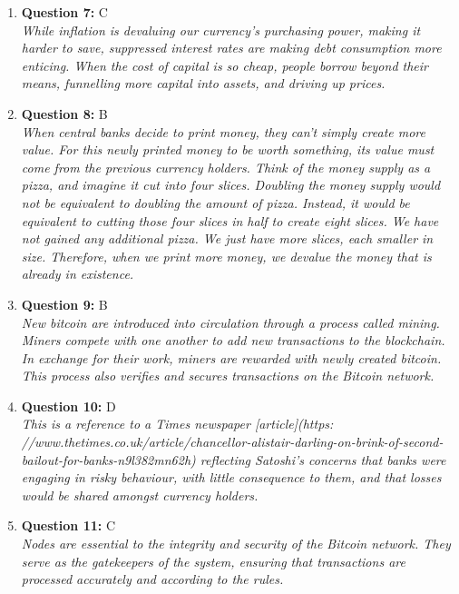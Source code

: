 \documentclass[12pt,a4paper]{article}
\begin{document}
\begin{enumerate}
\item \textbf{Question 7:} C
\\ \textit{While inflation is devaluing our currency’s purchasing power, making it 
harder to save, suppressed interest rates are making debt consumption 
more enticing. When the cost of capital is so cheap, people borrow beyond 
their means, funnelling more capital into assets, and driving up prices.}

\item \textbf{Question 8:} B
\\ \textit{When central banks decide to print money, they can’t simply create more value. 
For this newly printed money to be worth something, its value must come from the 
previous currency holders.
Think of the money supply as a pizza, and imagine it cut into four slices. 
Doubling the money supply would not be equivalent to doubling the amount of pizza. 
Instead, it would be equivalent to cutting those four slices in half to create 
eight slices. We have not gained any additional pizza. We just have more slices, 
each smaller in size. Therefore, when we print more money, we devalue the money 
that is already in existence.}

\item \textbf{Question 9:} B
\\ \textit{New bitcoin are introduced into circulation through a process called mining. 
Miners compete with one another to add new transactions to the blockchain. 
In exchange for their work, miners are rewarded with newly created bitcoin. 
This process also verifies and secures transactions on the Bitcoin network.}

\item \textbf{Question 10:} D
\\ \textit{This is a reference to a Times newspaper [article](https: //www.thetimes.co.uk/article/chancellor-alistair-darling-on-brink-of-second-bailout-for-banks-n9l382mn62h) reflecting Satoshi’s 
concerns that banks were engaging in risky behaviour, with little 
consequence to them, and that losses would be shared amongst currency holders.}

\item \textbf{Question 11:} C
\\ \textit{Nodes are essential to the integrity and security of the Bitcoin network. 
They serve as the gatekeepers of the system, ensuring that transactions 
are processed accurately and according to the rules.}


\end{enumerate}
\end{document}
